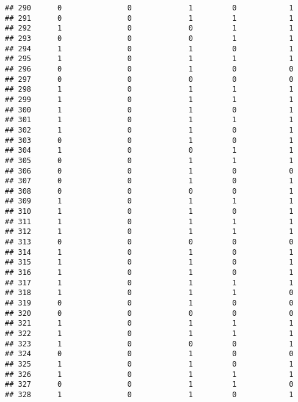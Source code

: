 \documentclass[]{article}
\begin{document}
\begin{verbatim}
## 290      0               0             1         0            1
## 291      0               0             1         1            1
## 292      1               0             0         1            1
## 293      0               0             0         1            1
## 294      1               0             1         0            1
## 295      1               0             1         1            1
## 296      0               0             1         0            0
## 297      0               0             0         0            0
## 298      1               0             1         1            1
## 299      1               0             1         1            1
## 300      1               0             1         0            1
## 301      1               0             1         1            1
## 302      1               0             1         0            1
## 303      0               0             1         0            1
## 304      1               0             0         1            1
## 305      0               0             1         1            1
## 306      0               0             1         0            0
## 307      0               0             1         0            1
## 308      0               0             0         0            1
## 309      1               0             1         1            1
## 310      1               0             1         0            1
## 311      1               0             1         1            1
## 312      1               0             1         1            1
## 313      0               0             0         0            0
## 314      1               0             1         0            1
## 315      1               0             1         0            1
## 316      1               0             1         0            1
## 317      1               0             1         1            1
## 318      1               0             1         1            0
## 319      0               0             1         0            0
## 320      0               0             0         0            0
## 321      1               0             1         1            1
## 322      1               0             1         1            1
## 323      1               0             0         0            1
## 324      0               0             1         0            0
## 325      1               0             1         0            1
## 326      1               0             1         1            1
## 327      0               0             1         1            0
## 328      1               0             1         0            1

\end{verbatim}
\end{document}
